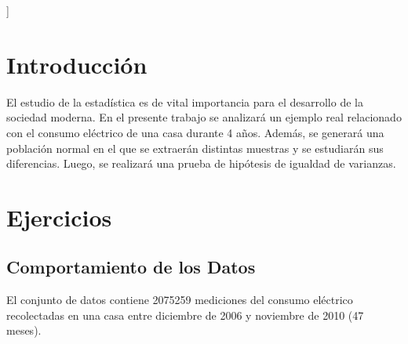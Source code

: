 \documentclass[a4paper,10pt,twocolumn]{report}
\begin{document}
\vspace{0.8cm}
]



\section{Introducción}\label{sec:intro}
 
 El estudio de la estadística es de vital importancia para el desarrollo de la sociedad moderna. En el presente trabajo se analizará un ejemplo real relacionado con el consumo eléctrico de una casa durante 4 años. Además, se generará una población normal en el que se extraerán distintas muestras y se estudiarán sus diferencias. Luego, se realizará una prueba de hipótesis de igualdad de varianzas.




\section{Ejercicios}\label{sec:dev}
 

	\subsection{Comportamiento de los Datos}\label{sub:ex1}
	El conjunto de datos contiene 2075259 mediciones del consumo eléctrico recolectadas en una casa entre diciembre de 2006 y noviembre de 2010 (47 meses).
	
\end{document}
